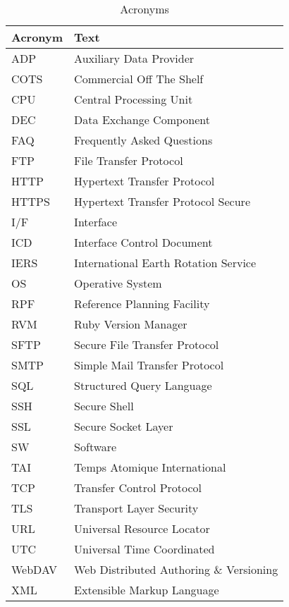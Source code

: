 \documentclass[dec_sum_main.tex]{subfiles}
\begin{document}
\begin{longtable}{|m{2.8cm}|m{10cm}|}
	\caption{Acronyms\label{long}} \\
    \hline
	\textbf{Acronym} & \textbf{Text} \\
	\hline
	ADP & Auxiliary Data Provider \\ \hline
	COTS & Commercial Off The Shelf \\ \hline
	CPU & Central Processing Unit \\ \hline
	DEC & Data Exchange Component \\ \hline
	FAQ & Frequently Asked Questions \\ \hline
	FTP & File Transfer Protocol \\ \hline
	HTTP & Hypertext Transfer Protocol \\ \hline
	HTTPS & Hypertext Transfer Protocol Secure\\ \hline
	I/F & Interface \\ \hline
	ICD & Interface Control Document \\ \hline
	IERS & International Earth Rotation Service \\ \hline
	OS & Operative System \\ \hline
	RPF & Reference Planning Facility \\ \hline
	RVM & Ruby Version Manager \\ \hline
	SFTP & Secure File Transfer Protocol \\ \hline
	SMTP & Simple Mail Transfer Protocol \\ \hline
	SQL & Structured Query Language \\ \hline
	SSH & Secure Shell \\ \hline
	SSL & Secure Socket Layer \\ \hline
	SW & Software \\ \hline
	TAI & Temps Atomique International \\ \hline
	TCP & Transfer Control Protocol \\ \hline
	TLS & Transport Layer Security \\ \hline
	URL & Universal Resource Locator \\ \hline
	UTC & Universal Time Coordinated \\ \hline
	WebDAV & Web Distributed Authoring \& Versioning \\ \hline
	XML & Extensible Markup Language \\ \hline						
\end{longtable}
\end{document}
